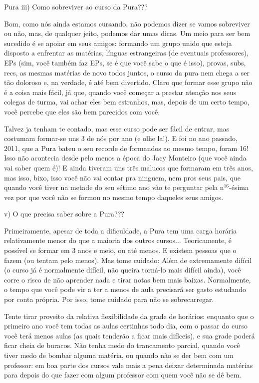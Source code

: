 \begin{subsecao}{Pura}
iii) Como sobreviver ao curso da Pura???

Bom, como nós ainda estamos cursando, não podemos dizer se vamos sobreviver ou
não, mas, de qualquer jeito, podemos dar umas dicas. Um meio para ser bem
sucedido é se apoiar em seus amigos: formando um grupo unido que esteja
disposto a enfrentar as matérias, línguas estrangeiras (de eventuais
professores), EPs (sim, você também faz EPs, se é que você sabe o que é isso),
provas, subs, recs, as mesmas matérias de novo todos juntos, o curso da pura
nem chega a ser tão doloroso e, na verdade, é até bem divertido. Claro que
formar esse grupo não é a coisa mais fácil, já que, quando você começar a
prestar atenção nos seus colegas de turma, vai achar eles bem estranhos, mas,
depois de um certo tempo, você percebe que eles são bem parecidos com você.

Talvez ja tenham te contado, mas esse curso pode ser fácil de entrar, mas
costumam formar-se uns 3 de nós por ano (e olhe la!). E foi no ano
passado, 2011, que a Pura bateu o seu recorde de formandos ao mesmo tempo,
foram 16! Isso não acontecia desde pelo menos a época do Jacy Monteiro (que
você ainda vai saber quem é)! E ainda tiveram uns três malucos que formaram em
três anos, mas isso, bixo, isso você não vai contar pra ninguem, nem pros seus
pais, que quando você tiver na metade do seu sétimo ano vão te perguntar pela
n$^16$-ésima vez por que você não se formou no mesmo tempo daqueles seus amigos.

v) O que precisa saber sobre a Pura???

Primeiramente, apesar de toda a dificuldade, a Pura tem uma carga horária
relativamente menor do que a maioria dos outros cursos... Teoricamente, é
possível se formar em 3 anos e meio, ou até menos. E existem pessoas que o
fazem (ou tentam pelo menos). Mas tome cuidado: Além de extremamente difícil (o
curso já é normalmente difícil, não queira torná-lo mais difícil ainda), você
corre o risco de não aprender nada e tirar notas bem mais baixas. Normalmente,
o tempo que você pode vir a ter a menos de aula precisará ser gasto estudando
por conta própria. Por isso, tome cuidado para não se sobrecarregar.

Tente tirar proveito da relativa flexibilidade da grade de horários: enquanto
que o primeiro ano você tem todas as aulas certinhas todo dia, com o passar do
curso você terá menos aulas (as quais tenderão a ficar mais difíceis), e sua
grade poderá ficar cheia de buracos. Não tenha medo do trancamento parcial,
quando você tiver medo de bombar alguma matéria, ou quando não se der bem com
um professor: em boa parte dos cursos vale mais a pena deixar determinada
matérias para depois do que fazer com algum professor com quem você não se dê
bem.


\end{subsecao}
